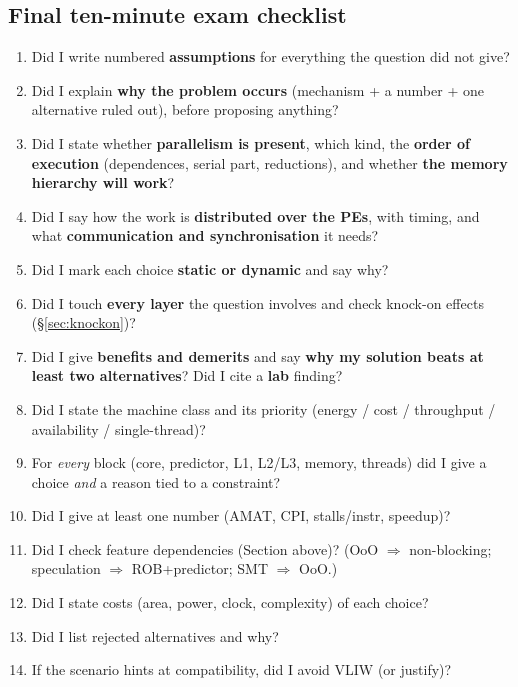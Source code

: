 \subsection{Final ten-minute exam checklist}\label{sec:checklist}
\begin{enumerate}[leftmargin=*]
\item Did I write numbered \textbf{assumptions} for everything the question did not give?
\item Did I explain \textbf{why the problem occurs} (mechanism + a number + one alternative ruled out), before proposing anything?
\item Did I state whether \textbf{parallelism is present}, which kind, the \textbf{order of execution} (dependences, serial part, reductions), and whether \textbf{the memory hierarchy will work}?
\item Did I say how the work is \textbf{distributed over the PEs}, with timing, and what \textbf{communication and synchronisation} it needs?
\item Did I mark each choice \textbf{static or dynamic} and say why?
\item Did I touch \textbf{every layer} the question involves and check knock-on effects (\S\ref{sec:knockon})?
\item Did I give \textbf{benefits and demerits} and say \textbf{why my solution beats at least two alternatives}? Did I cite a \textbf{lab} finding?
\item Did I state the machine class and its priority (energy / cost / throughput / availability / single-thread)?
\item For \emph{every} block (core, predictor, L1, L2/L3, memory, threads) did I give a choice \emph{and} a reason tied to a constraint?
\item Did I give at least one number (AMAT, CPI, stalls/instr, speedup)?
\item Did I check feature dependencies (Section above)? (OoO $\Rightarrow$ non-blocking; speculation $\Rightarrow$ ROB+predictor; SMT $\Rightarrow$ OoO.)
\item Did I state costs (area, power, clock, complexity) of each choice?
\item Did I list rejected alternatives and why?
\item If the scenario hints at compatibility, did I avoid VLIW (or justify)?
\end{enumerate}
